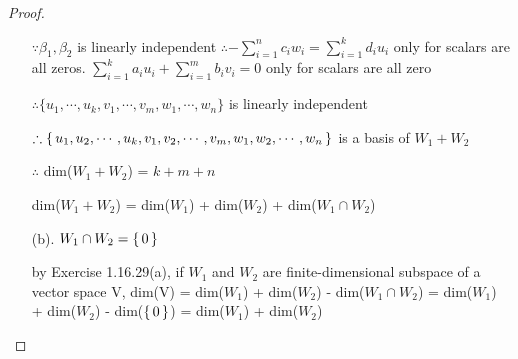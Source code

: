 \begin{proof}
\begin{enumerate}
			$\because \beta_1 , \beta_2$ is linearly independent
			$\therefore -\sum^n_{i=1}c_iw_i = \sum^k_{i=1}d_iu_i$ only for scalars are all zeros.
			$\sum^k_{i=1}a_iu_i + \sum^m_{i=1}b_iv_i = 0$ only for scalars are all zero
			
			$\therefore \{u_1,\cdots,u_k,v_1,\cdots,v_m,w_1,\cdots,w_n\}$ is linearly independent

			$\therefore \left\{ \,u_1,u_2,\cdots,u_k,v_1,v_2,\cdots,v_m,w_1,w_2,\cdots,w_n \,\right\}$ is a basis of $W_1 + W_2$
			
			
			
			$\therefore$ dim($W_1 + W_2$) = $k+m+n$
			
			dim($W_1 + W_2$) = dim($W_1$) + dim($W_2$) + dim($W_1 \cap W_2$)
			
			\item [(b).] $W_1 \cap W_2 = \left\{ \,0 \,\right\}$
			
			by Exercise 1.16.29(a), if $W_1$ and $W_2$ are finite-dimensional subspace of a vector space V, dim(V) = dim($W_1$) + dim($W_2$) - dim($W_1 \cap W_2$) = dim($W_1$) + dim($W_2$) - dim($\left\{ \,0 \,\right\}$) = dim($W_1$) + dim($W_2$)


\end{enumerate} 			
						
	\end{proof}
